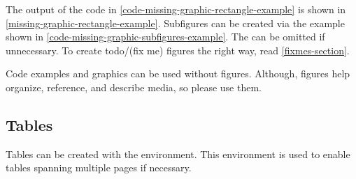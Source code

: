 The output of the code in \cref{code-missing-graphic-rectangle-example}
is shown in \cref{missing-graphic-rectangle-example}.
Subfigures can be created via the example shown in \cref{code-missing-graphic-subfigures-example}.
The  can be omitted if unnecessary.
To create todo/(fix me) figures the right way, read \cref{fixmes-section}.

Code examples and graphics can be used without figures.
Although, figures help organize, reference, and describe media,
so please use them.


\subsection{Tables}
Tables can be created with the  environment.
This environment is used to enable tables spanning multiple pages if necessary.

